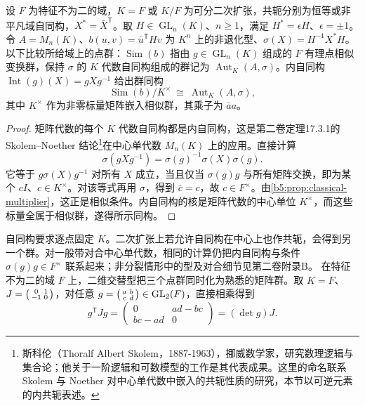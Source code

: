 \begin{proposition}\label{b5:prop:involution-automorphism-similitude}
	设 \(F\) 为特征不为二的域，\(K=F\) 或 \(K/F\) 为可分二次扩张，共轭分别为恒等或非平凡域自同构，\(X^*=\bar X^{\mathsf T}\)。取 \(H\in\operatorname{GL}_n(K)\)、\(n\ge1\)，满足 \(H^*=\epsilon H\)、\(\epsilon=\pm1\)。令 \(A=M_n(K)\)、\(b(u,v)=\bar u^{\mathsf T}Hv\) 为 \(K^n\) 上的非退化型、\(\sigma(X)=H^{-1}X^*H\)。以下比较所给域上的点群：\(\operatorname{Sim}(b)\) 指由 \(g\in\operatorname{GL}_n(K)\) 组成的 \(F\) 有理点相似变换群，保持 \(\sigma\) 的 \(K\) 代数自同构组成的群记为 \(\operatorname{Aut}_K(A,\sigma)\)。内自同构 \(\operatorname{Int}(g)(X)=gXg^{-1}\) 给出群同构
	\[
		\operatorname{Sim}(b)/K^\times \ \cong\ \operatorname{Aut}_K(A,\sigma),
	\]
	其中 \(K^\times\) 作为非零标量矩阵嵌入相似群，其乘子为 \(\bar a a\)。
\end{proposition}
\begin{proof}
	矩阵代数的每个 \(K\) 代数自同构都是内自同构，这是第二卷定理17.3.1的 Skolem--Noether 结论\footnote{斯科伦（Thoralf Albert Skolem，1887-1963），挪威数学家，研究数理逻辑与集合论；他关于一阶逻辑和可数模型的工作是其代表成果。这里的命名联系 Skolem 与 Noether 对中心单代数中嵌入的共轭性质的研究，本节以可逆元素的内共轭表述。}在中心单代数 \(M_n(K)\) 上的应用。直接计算
	\[
		\sigma(gXg^{-1})=\sigma(g)^{-1}\sigma(X)\sigma(g).
	\]
	它等于 \(g\sigma(X)g^{-1}\) 对所有 \(X\) 成立，当且仅当 \(\sigma(g)g\) 与所有矩阵交换，即为某个 \(cI\)、\(c\in K^\times\)。对该等式再用 \(\sigma\)，得到 \(\bar c=c\)，故 \(c\in F^\times\)。由\cref{b5:prop:classical-multiplier}，这正是相似条件。内自同构的核是矩阵代数的中心单位 \(K^\times\)，而这些标量全属于相似群，遂得所示同构。
\end{proof}
自同构要求逐点固定 \(K\)。二次扩张上若允许自同构在中心上也作共轭，会得到另一个群。对一般带对合中心单代数，相同的计算仍把内自同构与条件 \(\sigma(g)g\in F^\times\) 联系起来；非分裂情形中的型及对合细节见第二卷附录B。
\ProseParagraphBreak
在特征不为二的域 \(F\) 上，二维交替型把三个点群同时化为熟悉的矩阵群。取 \(K=F\)、\(J=\begin{psmallmatrix}0&1\\-1&0\end{psmallmatrix}\)，对任意 \(g=\begin{psmallmatrix}a&b\\c&d\end{psmallmatrix}\in\operatorname{GL}_2(F)\)，直接相乘得到
\[
	g^{\mathsf T}Jg
	=\begin{pmatrix}0&ad-bc\\bc-ad&0\end{pmatrix}
	=(\det g)J.
\]
